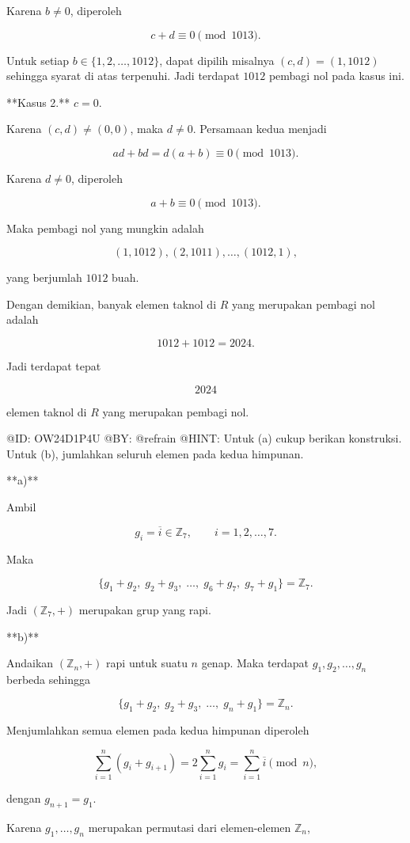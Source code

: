 Karena $b\ne0$, diperoleh

$$
c+d\equiv0\pmod{1013}.
$$

Untuk setiap $b\in\{1,2,\ldots,1012\}$, dapat dipilih misalnya $(c,d)=(1,1012)$ sehingga syarat di atas terpenuhi. Jadi terdapat $1012$ pembagi nol pada kasus ini.

**Kasus 2.** $c=0$.

Karena $(c,d)\ne(0,0)$, maka $d\ne0$. Persamaan kedua menjadi

$$
ad+bd=d(a+b)\equiv0\pmod{1013}.
$$

Karena $d\ne0$, diperoleh

$$
a+b\equiv0\pmod{1013}.
$$

Maka pembagi nol yang mungkin adalah

$$
(1,1012),(2,1011),\ldots,(1012,1),
$$

yang berjumlah $1012$ buah.

Dengan demikian, banyak elemen taknol di $R$ yang merupakan pembagi nol adalah

$$
1012+1012=2024.
$$

Jadi terdapat tepat

$$
\boxed{2024}
$$

elemen taknol di $R$ yang merupakan pembagi nol.


@ID: OW24D1P4U
@BY: @refrain
@HINT: Untuk (a) cukup berikan konstruksi. Untuk (b), jumlahkan seluruh elemen pada kedua himpunan.

**a)**

Ambil

$$
g_i=\overline{i}\in\mathbb Z_7,
\qquad i=1,2,\ldots,7.
$$

Maka

$$
\{g_1+g_2,\;g_2+g_3,\;\ldots,\;g_6+g_7,\;g_7+g_1\}
=\mathbb Z_7.
$$

Jadi $(\mathbb Z_7,+)$ merupakan grup yang rapi.

**b)**

Andaikan $(\mathbb Z_n,+)$ rapi untuk suatu $n$ genap. Maka terdapat $g_1,g_2,\ldots,g_n$ berbeda sehingga

$$
\{g_1+g_2,\;g_2+g_3,\;\ldots,\;g_n+g_1\}
=\mathbb Z_n.
$$

Menjumlahkan semua elemen pada kedua himpunan diperoleh

$$
\sum_{i=1}^n(g_i+g_{i+1})
=
2\sum_{i=1}^n g_i
=
\sum_{i=1}^n\overline{i}
\pmod n,
$$

dengan $g_{n+1}=g_1$.

Karena $g_1,\ldots,g_n$ merupakan permutasi dari elemen-elemen $\mathbb Z_n$,

